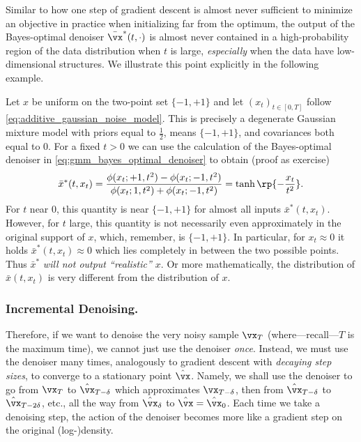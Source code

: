 \documentclass[../../book-main.tex]{subfiles}
\begin{document}
Similar to how one step of gradient descent is almost never sufficient to
minimize an objective in practice when initializing far from the optimum, the
output of the Bayes-optimal denoiser \(\bar{\vx}^{\ast}(t, \cdot)\) is almost never contained in a high-probability region of the data distribution when \(t\) is large, \textit{especially} when the data have low-dimensional structures. We illustrate this point explicitly in the following example.
\begin{example}\label{example:denoising_twopoints}
	Let \(x\) be uniform on the two-point set \(\{-1, +1\}\) and let \((x_{t})_{t \in [0, T]}\) follow \eqref{eq:additive_gaussian_noise_model}. This is precisely a degenerate Gaussian mixture model with priors equal to \(\frac{1}{2}\), means \(\{-1, +1\}\), and covariances both equal to \(0\). For a fixed \(t > 0\) we can use the calculation of the Bayes-optimal denoiser in \eqref{eq:gmm_bayes_optimal_denoiser} to obtain (proof as exercise)
	\begin{equation}
		\bar{x}^{\ast}(t, x_{t}) = \frac{\phi(x_{t} ; +1, t^{2}) - \phi(x_{t}
		; -1, t^{2})}{\phi(x_{t} ; 1, t^{2}) + \phi(x_{t} ; -1, t^{2})} = \tanh\rp{-\frac{x_{t}}{t^{2}}}.
	\end{equation}
	For \(t\) near \(0\), this quantity is near \(\{-1, +1\}\) for almost all inputs \(\bar{x}^{\ast}(t, x_{t})\). However, for \(t\) large, this quantity is not necessarily even approximately in the original support of \(x\), which, remember, is \(\{-1, +1\}\). In particular, for \(x_{t} \approx 0\) it holds \(\bar{x}^{\ast}(t, x_{t}) \approx 0\) which lies completely in between the two possible points. Thus \(\bar{x}^{\ast}\) \textit{will not output ``realistic'' \(x\)}. Or more mathematically, the distribution of \(\bar{x}(t, x_{t})\) is very different from the distribution of \(x\).
\end{example}


\subsubsection{Incremental Denoising.}
Therefore, if we want to denoise the very noisy sample \(\vx_{T}\) (where—recall—\(T\) is the maximum time), we cannot just use the denoiser \textit{once}. Instead, we must use the denoiser many times, analogously to gradient descent with \textit{decaying step sizes}, to converge to a stationary point \(\hat{\vx}\). Namely, we shall use the denoiser to go from \(\vx_{T}\) to \(\hat{\vx}_{T - \delta}\) which approximates \(\vx_{T - \delta}\), then from \(\hat{\vx}_{T - \delta}\) to \(\hat{\vx}_{T - 2\delta}\), etc., all the way from \(\hat{\vx}_{\delta}\) to \(\hat{\vx} = \hat{\vx}_{0}\). Each time we take a denoising step, the action of the denoiser becomes more like a gradient step on the original (log-)density. 
\end{document}
